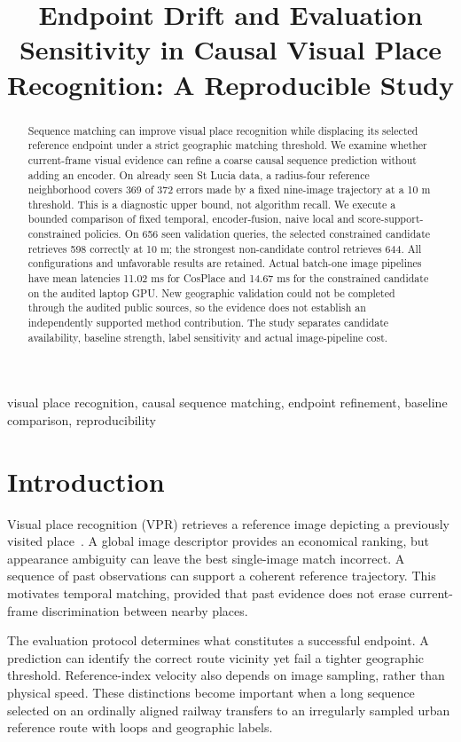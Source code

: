 \documentclass[conference]{IEEEtran}
\title{Endpoint Drift and Evaluation Sensitivity in Causal Visual Place Recognition: A Reproducible Study}
\author{\IEEEauthorblockN{Mingyang Zhou}\IEEEauthorblockA{University of Chinese Academy of Sciences\\\textit{Additional authors and correspondence pending}}}
\begin{document}
\maketitle
\begin{abstract}
Sequence matching can improve visual place recognition while displacing its selected reference endpoint under a strict geographic matching threshold. We examine whether current-frame visual evidence can refine a coarse causal sequence prediction without adding an encoder. On already seen St Lucia data, a radius-four reference neighborhood covers 369 of 372 errors made by a fixed nine-image trajectory at a 10 m threshold. This is a diagnostic upper bound, not algorithm recall. We execute a bounded comparison of fixed temporal, encoder-fusion, naive local and score-support-constrained policies. On 656 seen validation queries, the selected constrained candidate retrieves 598 correctly at 10 m; the strongest non-candidate control retrieves 644. All configurations and unfavorable results are retained. Actual batch-one image pipelines have mean latencies 11.02 ms for CosPlace and 14.67 ms for the constrained candidate on the audited laptop GPU. New geographic validation could not be completed through the audited public sources, so the evidence does not establish an independently supported method contribution. The study separates candidate availability, baseline strength, label sensitivity and actual image-pipeline cost.
\end{abstract}
\begin{IEEEkeywords}visual place recognition, causal sequence matching, endpoint refinement, baseline comparison, reproducibility\end{IEEEkeywords}

\section{Introduction}
Visual place recognition (VPR) retrieves a reference image depicting a previously visited place~\cite{tutorial}. A global image descriptor provides an economical ranking, but appearance ambiguity can leave the best single-image match incorrect. A sequence of past observations can support a coherent reference trajectory. This motivates temporal matching, provided that past evidence does not erase current-frame discrimination between nearby places.

The evaluation protocol determines what constitutes a successful endpoint. A prediction can identify the correct route vicinity yet fail a tighter geographic threshold. Reference-index velocity also depends on image sampling, rather than physical speed. These distinctions become important when a long sequence selected on an ordinally aligned railway transfers to an irregularly sampled urban reference route with loops and geographic labels.
\end{document}

